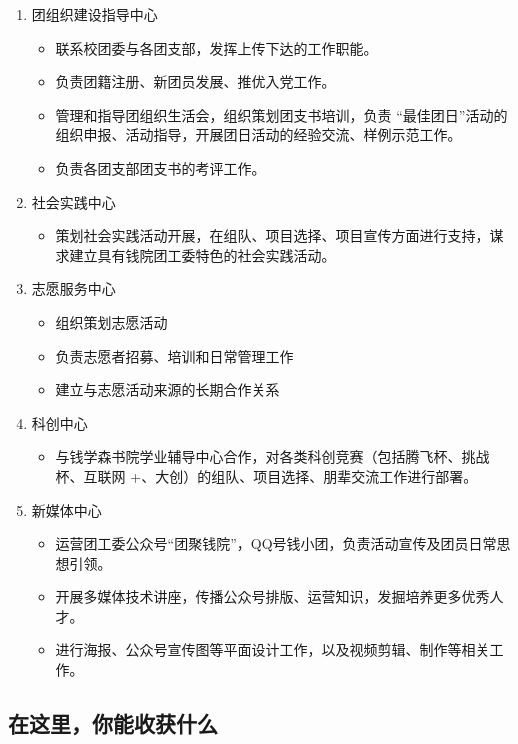 \documentclass[
decoration,  %
]{qyxf-book}
\begin{document}
	\begin{enumerate}
		\item 团组织建设指导中心
		\begin{itemize}
			\item
			联系校团委与各团支部，发挥上传下达的工作职能。
			\item
			负责团籍注册、新团员发展、推优入党工作。
			\item
			管理和指导团组织生活会，组织策划团支书培训，负责 “最佳团日”活动的组织申报、活动指导，开展团日活动的经验交流、样例示范工作。
			\item
			负责各团支部团支书的考评工作。
		\end{itemize}
		\item 社会实践中心
		\begin{itemize}
			\item
			策划社会实践活动开展，在组队、项目选择、项目宣传方面进行支持，谋求建立具有钱院团工委特色的社会实践活动。
		\end{itemize}
		\item 志愿服务中心
		\begin{itemize}
			\item
			组织策划志愿活动
			\item
			负责志愿者招募、培训和日常管理工作
			\item
			建立与志愿活动来源的长期合作关系
		\end{itemize}
		\item 科创中心
		\begin{itemize}
			\item 与钱学森书院学业辅导中心合作，对各类科创竞赛（包括腾飞杯、挑战杯、互联网 +、大创）的组队、项目选择、朋辈交流工作进行部署。
		\end{itemize}
		\item 新媒体中心
		\begin{itemize}
			\item
			运营团工委公众号“团聚钱院”，QQ号钱小团，负责活动宣传及团员日常思想引领。
			\item
			开展多媒体技术讲座，传播公众号排版、运营知识，发掘培养更多优秀人才。
			\item
			进行海报、公众号宣传图等平面设计工作，以及视频剪辑、制作等相关工作。
		\end{itemize}
	\end{enumerate}
	
	\subsection{在这里，你能收获什么}
	
\end{document}
